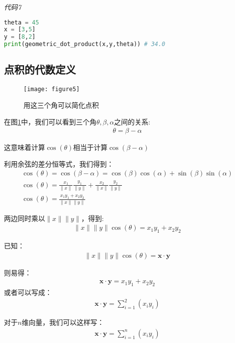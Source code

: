 \emph{代码7}

\begin{lstlisting}[language=python]
theta = 45 
x = [3,5] 
y = [8,2] 
print(geometric_dot_product(x,y,theta)) # 34.0
\end{lstlisting}

\subsection{点积的代数定义}

\begin{figure}[ht]
    \centering
    \texttt{[image: figure5]}
    \caption{用这三个角可以简化点积}
    \label{figure5}
\end{figure}

在图\ref{figure5}中，我们可以看到三个角$\theta,\beta,\alpha$之间的关系:
\begin{gather*}
\theta=\beta-\alpha
\end{gather*}

这意味着计算$\cos(\theta)$相当于计算$\cos(\beta-\alpha)$

利用余弦的差分恒等式，我们得到：
\begin{gather*}
\cos(\theta)=\cos(\beta-\alpha) = \cos(\beta)\cos(\alpha)+\sin(\beta)\sin(\alpha) \\
\cos(\theta) = \frac{x_1}{\|x\|}\frac{y_1}{\|y\|} + \frac{x_2}{\|x\|}\frac{y_2}{\|y\|} \\
\cos(\theta) = \frac{x_1y_1+x_2y_2}{\|x\|\|y\|}
\end{gather*}

两边同时乘以$\|x\|\|y\|$，得到:
\begin{gather*}
\|x\|\|y\|\cos(\theta) = x_1y_1+x_2y_2
\end{gather*}

已知：
\begin{gather*}
\|x\|\|y\|\cos(\theta) = \mathbf{x}\cdot\mathbf{y}
\end{gather*}

则易得：
\begin{gather*}
\mathbf{x}\cdot\mathbf{y} = x_1y_1+x_2y_2
\end{gather*}
或者可以写成：
\begin{gather*}
\mathbf{x}\cdot\mathbf{y} = \sum_{i=1}^2(x_i y_i)
\end{gather*}

对于$n$维向量，我们可以这样写：
\begin{gather*}
\mathbf{x}\cdot\mathbf{y} = \sum_{i=1}^n(x_i y_i)
\end{gather*}

